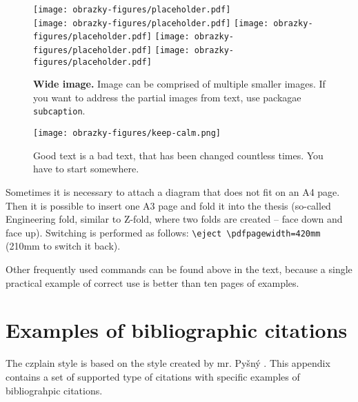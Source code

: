 \begin{figure*}[h]\centering
  \centering
  \texttt{[image: obrazky-figures/placeholder.pdf]}\\[1pt]
  \texttt{[image: obrazky-figures/placeholder.pdf]}\hfill
  \texttt{[image: obrazky-figures/placeholder.pdf]}\hfill
  \texttt{[image: obrazky-figures/placeholder.pdf]}\hfill
  \texttt{[image: obrazky-figures/placeholder.pdf]}
  \caption{\textbf{Wide image.} Image can be comprised of multiple smaller images. If you want to address the partial images from text, use packagae \texttt{subcaption}.}
  \label{sirokyObrazek}
\end{figure*}


\begin{figure}[hbt]
	\centering
	\texttt{[image: obrazky-figures/keep-calm.png]}
	\caption{Good text is a bad text, that has been changed countless times. You have to start somewhere.}
	\label{keepCalm}
\end{figure}

Sometimes it is necessary to attach a diagram that does not fit on an A4 page. Then it is possible to insert one A3 page and fold it into the thesis (so-called Engineering fold, similar to Z-fold, where two folds are created -- face down and face up). Switching is performed as follows: \texttt{\textbackslash{}eject \textbackslash{}pdfpagewidth=420mm} (210mm to switch it back).

Other frequently used commands can be found above in the text, because a single practical example of correct use is better than ten pages of examples.



\newcommand{\odradkovani}{\\[0.3em]}

\chapter{Examples of bibliographic citations}
\label{priloha-priklady-citaci}
The czplain style is based on the style created by mr. Pyšný \cite{Pysny}. This appendix contains a set of supported type of citations with specific examples of bibliograhpic citations.

